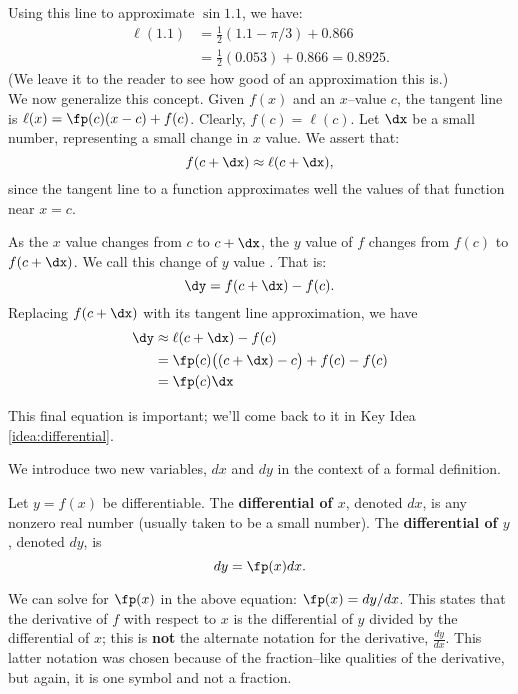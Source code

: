 Using this line to approximate $\sin 1.1$, we have:
\begin{align*}
	\ell(1.1) &= \frac12(1.1-\pi/3)+0.866 \\
					&= \frac12(0.053)+0.866 = 0.8925.
\end{align*}
(We leave it to the reader to see how good of an approximation this is.)\\

We now generalize this concept. Given $f(x)$ and an $x$--value $c$,  the tangent line is $\ell(x) = \fp(c)(x-c)+f(c)$. Clearly, $f(c) = \ell(c)$. Let $\dx$ be a small number, representing a small change in $x$ value. We assert that:
\[
f(c+\dx) \approx \ell(c+\dx),
\]
 since the tangent line to a function approximates well the values of that function near $x=c$. 

As the $x$ value changes from $c$ to $c+\dx$, the $y$ value of $f$ changes from $f(c)$ to $f(c+\dx)$. We call this change of $y$ value \dy. That is:
\[
\dy = f(c+\dx)-f(c).
\]
Replacing $f(c+\dx)$ with its tangent line approximation, we have 
\begin{align} \dy &\approx \ell(c+\dx) - f(c) \notag\\
								&= \fp(c)\big((c+\dx)-c\big)+f(c) - f(c)\notag \\
								&=\fp(c)\dx		\label{eq:differential}
\end{align}

This final equation is important; we'll come back to it in Key Idea \ref{idea:differential}.

We introduce two new variables, $dx$ and $dy$ in the context of a formal definition. %

{Let $y=f(x)$ be differentiable. The \textbf{differential of $x$}, denoted $dx$, is any nonzero real number (usually taken to be a small number). The \textbf{differential of $y$}, denoted $dy$, is 
\[
dy = \fp(x)dx.
\]
}

We can solve for $\fp(x)$ in the above equation: $\fp(x) = dy/dx$. This states that the derivative of $f$ with respect to $x$ is the differential of $y$ divided by the differential of $x$; this is \textbf{not} the alternate notation for the derivative, $\frac{dy}{dx}$. This latter notation was chosen because of the fraction--like qualities of the derivative, but again, it is one symbol and not a fraction.

